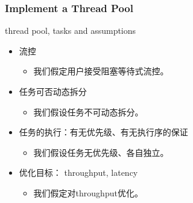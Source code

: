 \documentclass[UTF8,lualatex]{ctexbeamer}
\begin{document}
\begin{frame}
    \frametitle{Implement a Thread Pool}
    \begin{block}{thread pool, tasks and assumptions}
        \begin{itemize}
            \item 流控
                \begin{itemize}
                    \item<2-> 我们假定用户接受阻塞等待式流控。
                \end{itemize}
            \item 任务可否动态拆分
                \begin{itemize}
                    \item<3-> 我们假设任务不可动态拆分。
                \end{itemize}
            \item 任务的执行：有无优先级、有无执行序的保证
                \begin{itemize}
                    \item<4-> 我们假设任务无优先级、各自独立。
                \end{itemize}
            \item 优化目标： throughput, latency
                \begin{itemize}
                    \item<5-> 我们假定对throughput优化。
                \end{itemize}
        \end{itemize}
    \end{block}
\end{frame}

\end{document}
